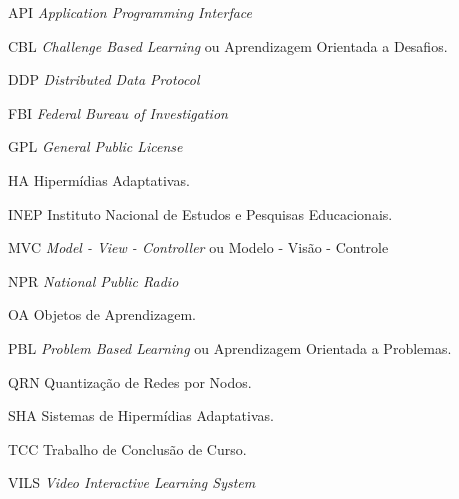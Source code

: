 \begin{siglas}
  \item[API] \textit{Application Programming Interface}  
  \item[CBL] \textit{Challenge Based Learning} ou Aprendizagem Orientada a Desafios.  
  \item[DDP] \textit{Distributed Data Protocol}  
  \item[FBI] \textit{Federal Bureau of Investigation}  
  \item[GPL] \textit{General Public License}
  \item[HA] Hipermídias Adaptativas.
  \item[INEP] Instituto Nacional de Estudos e Pesquisas Educacionais.  
  \item[MVC] \textit{Model - View - Controller} ou Modelo - Visão - Controle 
  \item[NPR] \textit{National Public Radio} 
  \item[OA] Objetos de Aprendizagem.  
  \item[PBL] \textit{Problem Based Learning} ou Aprendizagem Orientada a Problemas.  
  \item[QRN] Quantização de Redes por Nodos. 
  \item[SHA] Sistemas de Hipermídias Adaptativas.
  \item[TCC] Trabalho de Conclusão de Curso.
  \item[VILS] \textit{Video Interactive Learning System}
  \end{siglas}
 
